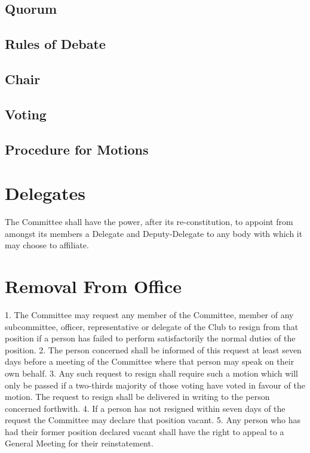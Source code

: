 \documentclass[12pt]{article} %
\begin{document}
\subsection{Quorum}
\subsection{Rules of Debate}
\subsection{Chair}
\subsection{Voting}
\subsection{Procedure for Motions}

\section{Delegates}
The Committee shall have the power, after its re-constitution, to appoint from amongst its
members a Delegate and Deputy-Delegate to any body with which it may choose to affiliate.

\section{Removal From Office}
1. The Committee may request any member of the Committee, member of any subcommittee,
officer, representative or delegate of the Club to resign from that position
if a person has failed to perform satisfactorily the normal duties of the position.
2. The person concerned shall be informed of this request at least seven days before a
meeting of the Committee where that person may speak on their own behalf.
3. Any such request to resign shall require such a motion which will only be passed if a
two-thirds majority of those voting have voted in favour of the motion. The request to
resign shall be delivered in writing to the person concerned forthwith.
4. If a person has not resigned within seven days of the request the Committee may
declare that position vacant.
5. Any person who has had their former position declared vacant shall have the right to
appeal to a General Meeting for their reinstatement.
\end{document}
